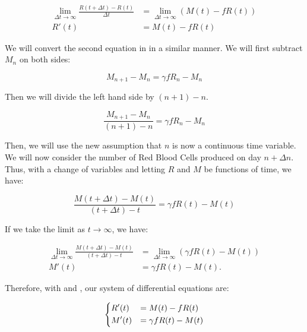 \begin{align}
    \lim_{\Delta t\to\infty} \frac{R(t+\Delta t) - R(t)}{\Delta t} &= \lim_{\Delta t\to\infty} (M(t) - fR(t)) \nonumber\\
    R'(t) &= M(t) - fR(t) \label{eq:linear-differential-equation-R}
\end{align}

We will convert the second equation in  in a similar manner. We will first subtract $M_n$ on both sides:

\begin{equation*}
    M_{n+1} - M_n = \gamma fR_n - M_n
\end{equation*}

Then we will divide the left hand side by $(n+1)-n$.

\begin{equation*}
    \frac{M_{n+1} - M_n}{(n+1)-n} = \gamma fR_n - M_n
\end{equation*}

Then, we will use the new assumption that $n$ is now a continuous time variable. We will now consider the number of Red Blood Cells produced on day $n+\Delta n$. Thus, with a change of variables and letting $R$ and $M$ be functions of time, we have:

\begin{equation*}
    \frac{M(t+\Delta t) - M(t)}{(t+\Delta t)-t} = \gamma fR(t) - M(t)
\end{equation*}

If we take the limit as $t\to\infty$, we have:

\begin{align} 
    \lim_{\Delta t \to\infty}\frac{M(t+\Delta t) - M(t)}{(t+\Delta t)-t} &= \lim_{\Delta t \to\infty} (\gamma fR(t) - M(t)) \nonumber\\
    M'(t) &= \gamma fR(t) - M(t).\label{eq:linear-differential-equation-M}
\end{align}

Therefore, with  and , our system of differential equations are:

\begin{equation}
    \begin{dcases}
        R'(t) &= M(t) - fR(t)\\
        M'(t) &= \gamma fR(t) - M(t)
    \end{dcases}
    \label{eq:linear-differential-model-system}
\end{equation}

